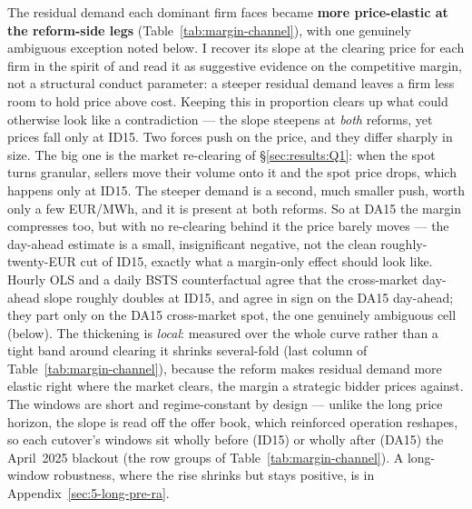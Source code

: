 \documentclass[11pt,a4paper]{article}
\theoremstyle{definition}
\theoremstyle{remark}
\theoremstyle{plain}
\begin{document}
The residual demand each dominant firm faces became \textbf{more price-elastic at the reform-side legs} (Table~\ref{tab:margin-channel}), with one genuinely ambiguous exception noted below. I recover its slope at the clearing price for each firm in the spirit of \citet[\S III.A]{ito_reguant_2016} and read it as suggestive evidence on the competitive margin, not a structural conduct parameter: a steeper residual demand leaves a firm less room to hold price above cost. Keeping this in proportion clears up what could otherwise look like a contradiction --- the slope steepens at \emph{both} reforms, yet prices fall only at ID15. Two forces push on the price, and they differ sharply in size. The big one is the market re-clearing of \S\ref{sec:results:Q1}: when the spot turns granular, sellers move their volume onto it and the spot price drops, which happens only at ID15. The steeper demand is a second, much smaller push, worth only a few EUR/MWh, and it is present at both reforms. So at DA15 the margin compresses too, but with no re-clearing behind it the price barely moves --- the day-ahead estimate is a small, insignificant negative, not the clean roughly-twenty-EUR cut of ID15, exactly what a margin-only effect should look like. Hourly OLS and a daily BSTS counterfactual agree that the cross-market day-ahead slope roughly doubles at ID15, and agree in sign on the DA15 day-ahead; they part only on the DA15 cross-market spot, the one genuinely ambiguous cell (below). The thickening is \emph{local}: measured over the whole curve rather than a tight band around clearing it shrinks several-fold (last column of Table~\ref{tab:margin-channel}), because the reform makes residual demand more elastic right where the market clears, the margin a strategic bidder prices against. The windows are short and regime-constant by design --- unlike the long price horizon, the slope is read off the offer book, which reinforced operation reshapes, so each cutover's windows sit wholly before (ID15) or wholly after (DA15) the April~2025 blackout (the row groups of Table~\ref{tab:margin-channel}). A long-window robustness, where the rise shrinks but stays positive, is in Appendix~\ref{sec:5-long-pre-ra}.
\end{document}
